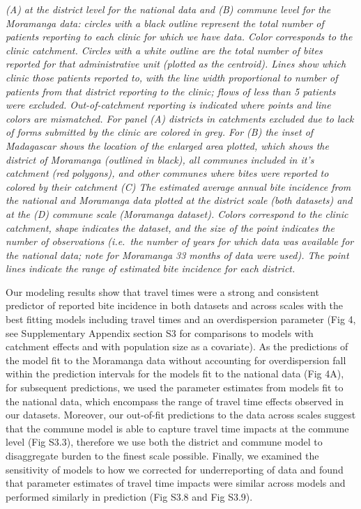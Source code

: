 \documentclass[
]{book}
\begin{document}
\emph{(A) at the district level for the national data and (B) commune level
for the Moramanga data: circles with a black outline represent the total
number of patients reporting to each clinic for which we have data.
Color corresponds to the clinic catchment. Circles with a white outline
are the total number of bites reported for that administrative unit
(plotted as the centroid). Lines show which clinic those patients
reported to, with the line width proportional to number of patients from
that district reporting to the clinic; flows of less than 5 patients
were excluded. Out-of-catchment reporting is indicated where points and
line colors are mismatched. For panel (A) districts in catchments
excluded due to lack of forms submitted by the clinic are colored in
grey. For (B) the inset of Madagascar shows the location of the enlarged
area plotted, which shows the district of Moramanga (outlined in black),
all communes included in it's catchment (red polygons), and other
communes where bites were reported to colored by their catchment (C) The
estimated average annual bite incidence from the national and Moramanga
data plotted at the district scale (both datasets) and at the (D)
commune scale (Moramanga dataset). Colors correspond to the clinic
catchment, shape indicates the dataset, and the size of the point
indicates the number of observations (i.e.~the number of years for which
data was available for the national data; note for Moramanga 33 months
of data were used). The point lines indicate the range of estimated bite
incidence for each district.}

Our modeling results show that travel times were a strong and consistent
predictor of reported bite incidence in both datasets and across scales
with the best fitting models including travel times and an
overdispersion parameter (Fig 4, see Supplementary Appendix section S3
for comparisons to models with catchment effects and with population
size as a covariate). As the predictions of the model fit to the
Moramanga data without accounting for overdispersion fall within the
prediction intervals for the models fit to the national data (Fig 4A),
for subsequent predictions, we used the parameter estimates from models
fit to the national data, which encompass the range of travel time
effects observed in our datasets. Moreover, our out-of-fit predictions
to the data across scales suggest that the commune model is able to
capture travel time impacts at the commune level (Fig S3.3), therefore
we use both the district and commune model to disaggregate burden to the
finest scale possible. Finally, we examined the sensitivity of models to
how we corrected for underreporting of data and found that parameter
estimates of travel time impacts were similar across models and
performed similarly in prediction (Fig S3.8 and Fig S3.9).
\end{document}
